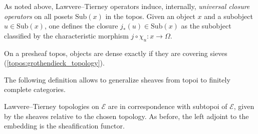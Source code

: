     As noted above, Lawvere--Tierney operators induce, internally, \textit{universal closure operators} on all posets $\mathrm{Sub}(x)$ in the topos. Given an object $x$ and a subobject $u\in\text{Sub}(x)$, one defines the closure $j_\ast(u)\in\text{Sub}(x)$ as the subobject classified by the characteristic morphism $j\circ\chi_u:x\rightarrow\Omega$.

    \begin{example}
        On a presheaf topos, objects are dense exactly if they are covering sieves (\cref{topos:grothendieck_topology}).
    \end{example}

    The following definition allows to generalize sheaves from topoi to finitely complete categories.

    \begin{property}
        Lawvere--Tierney topologies on $\mathcal{E}$ are in correspondence with subtopoi of $\mathcal{E}$, given by the sheaves relative to the chosen topology. As before, the left adjoint to the embedding is the sheafification functor.
    \end{property}

